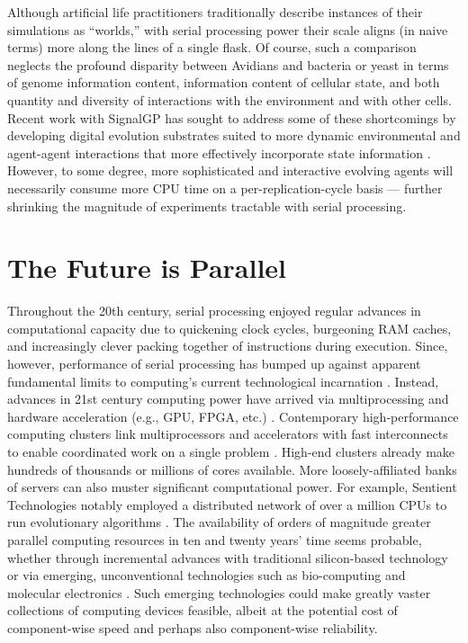 Although artificial life practitioners traditionally describe instances of their simulations as “worlds,” with serial processing power their scale aligns (in naive terms) more along the lines of a single flask.
Of course, such a comparison neglects the profound disparity between Avidians and bacteria or yeast in terms of genome information content, information content of cellular state, and both quantity and diversity of interactions with the environment and with other cells.
Recent work with SignalGP has sought to address some of these shortcomings by developing digital evolution substrates suited to more dynamic environmental and agent-agent interactions \citep{lalejini2018evolving} that more effectively incorporate state information \citep{lalejini2021tag,lalejini2020case, moreno2019evaluating}.
However, to some degree, more sophisticated and interactive evolving agents will necessarily consume more CPU time on a per-replication-cycle basis --- further shrinking the magnitude of experiments tractable with serial processing.

\section{The Future is Parallel}

Throughout the 20th century, serial processing enjoyed regular advances in computational capacity due to quickening clock cycles, burgeoning RAM caches, and increasingly clever packing together of instructions during execution.
Since, however, performance of serial processing has bumped up against apparent fundamental limits to computing’s current technological incarnation \citep{sutter2005free}.
Instead, advances in 21st century computing power have arrived via multiprocessing \citep[p.~55]{hennessy2011computer} and hardware acceleration (e.g., GPU, FPGA, etc.) \citep{che2008accelerating}.
Contemporary high-performance computing clusters link multiprocessors and accelerators with fast interconnects to enable coordinated work on a single problem \citep[p.~436]{hennessy2011computer}.
High-end clusters already make hundreds of thousands or millions of cores available. More loosely-affiliated banks of servers can also muster significant computational power.
For example, Sentient Technologies notably employed a distributed network of over a million CPUs to run evolutionary algorithms \citep{miikkulainen2019evolving}.
The availability of orders of magnitude greater parallel computing resources in ten and twenty years’ time seems probable, whether through incremental advances with traditional silicon-based technology or via emerging, unconventional technologies such as bio-computing \citep{benenson2009biocomputers} and molecular electronics \citep{xiang2016molecular}.
Such emerging technologies could make greatly vaster collections of computing devices feasible, albeit at the potential cost of component-wise speed \citep{bonnet2013amplifying, ellenbogen2000architectures} and perhaps also component-wise reliability.

